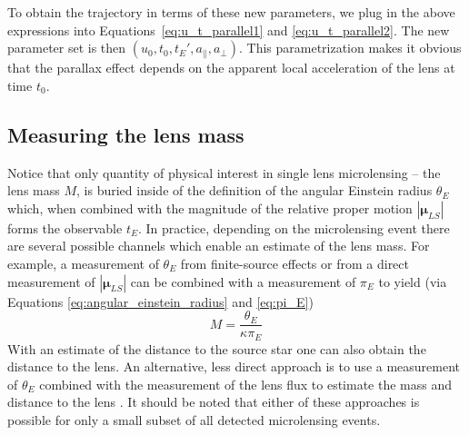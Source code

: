 \documentclass[12pt]{report}
\begin{document}
To obtain the trajectory in terms of these new parameters, we plug in the above expressions
into Equations~\ref{eq:u_t_parallel1} and \ref{eq:u_t_parallel2}.
The new parameter set is then $\left(u_0,t_0,t_E',a_\parallel,a_\bot\right)$. This parametrization makes it obvious that the parallax
effect depends on the apparent local acceleration of the lens at time $t_0$.

\subsection{Measuring the lens mass}
Notice that only quantity of physical interest in single lens microlensing --
the lens mass $M$, is buried inside of the definition of the angular Einstein
radius $\theta_E$ which, when combined with the magnitude of the relative
proper motion $|\boldsymbol\mu_{LS}|$ forms the observable $t_E$. In practice,
depending on the microlensing event there are several possible channels which
enable an estimate of the lens mass. For example, a measurement of $\theta_E$
from finite-source effects or from a direct measurement of
$|\boldsymbol\mu_{LS}|$ can be combined with a measurement of $\pi_E$ to yield
(via Equations \ref{eq:angular_einstein_radius} and \ref{eq:pi_E})
\begin{equation}
    M = \frac{\theta_E}{\kappa \pi_E}
\end{equation}
With an estimate of the distance to the source star one can also obtain the distance
to the lens.
An alternative, less direct approach is to use a measurement of $\theta_E$ combined
with the measurement of the lens flux to estimate the mass and distance to the lens
\citep{2007ApJ...660..781B}.
It should be noted that either of these approaches is possible for only a small subset
of all detected microlensing events.
\end{document}

